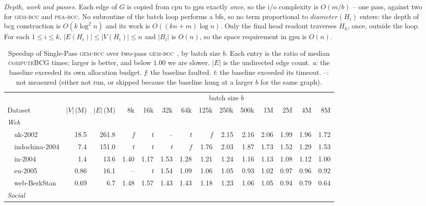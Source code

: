 \documentclass[11pt]{article}
\begin{document}
\medskip\noindent
\emph{Depth, work and passes.} Each edge of $G$ is copied from cpu to gpu
exactly \emph{once}, so the i/o complexity is $O(m/b)$ -- one pass, against
two for \textsc{gem-bcc} and \textsc{pea-bcc}. No subroutine of the batch loop performs a
bfs, so no term proportional to $\mathit{diameter}(H_i)$ enters: the depth of
bcg construction is $O(k\log^2 n)$ and its work is $O((kn+m)\log n)$. Only the
final head readout traverses $H_k$, once, outside the loop. For each $1 \le i \le
k$, $|E(H_i)| \le |V(H_i)| \le n$ and $|B_i|$ is $O(n)$, so the space
requirement in gpu is $O(n)$.

\clearpage

\begin{table}[t]
\centering
\caption{Speedup of Single-Pass \textsc{gem-bcc} over two-pass
\textsc{gem-bcc}~\cite{europar25}, by batch size $b$. Each entry is the ratio
of median \textsc{computeBCG} times; larger is better, and below $1.00$ we are
slower. $|E|$ is the undirected edge count.
\emph{a}: the baseline exceeded its own allocation budget.
\emph{f}: the baseline faulted.
\emph{t}: the baseline exceeded its timeout.
--: not measured (either not run, or skipped because the baseline hung at a
larger $b$ for the same graph).}
\label{tab:speedup}
\small
\setlength{\tabcolsep}{4pt}
\begin{tabular}{lrrrrrrrrrrrrr}
\toprule
 & & & \multicolumn{11}{c}{batch size $b$} \\
\cmidrule(l){4-14}
Dataset & $|V|$\,(M) & $|E|$\,(M) & 8k & 16k & 32k & 64k & 125k & 250k & 500k & 1M & 2M & 4M & 8M \\
\midrule
\multicolumn{14}{l}{\emph{Web}} \\
~~uk-2002 & 18.5 & 261.8 & \emph{f} & \emph{t} & -- & \emph{t} & \emph{f} & 2.15 & 2.16 & 2.06 & 1.99 & 1.96 & 1.72 \\
~~indochina-2004 & 7.4 & 151.0 & \emph{t} & \emph{t} & \emph{t} & \emph{f} & 1.76 & 2.03 & 1.87 & 1.73 & 1.52 & 1.29 & 1.53 \\
~~in-2004 & 1.4 & 13.6 & 1.40 & 1.17 & 1.53 & 1.28 & 1.21 & 1.24 & 1.16 & 1.13 & 1.08 & 1.12 & 1.00 \\
~~eu-2005 & 0.86 & 16.1 & -- & \emph{t} & 1.54 & 1.09 & 1.06 & 1.05 & 0.93 & 1.02 & 0.97 & 0.96 & 0.92 \\
~~web-BerkStan & 0.69 & 6.7 & 1.48 & 1.57 & 1.43 & 1.43 & 1.18 & 1.23 & 1.06 & 1.05 & 0.94 & 0.79 & 0.64 \\
\multicolumn{14}{l}{\emph{Social}} \\

\end{tabular}
\end{table}
\end{document}
